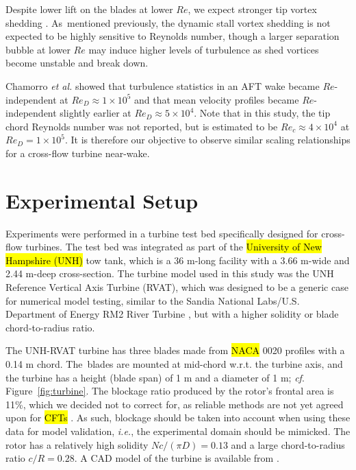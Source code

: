 \documentclass[energies,article,accept,moreauthors,pdftex,10pt,a4paper]{mdpi}
\theoremstyle{mdpi}
\newcounter{ex}
\newcounter{re}
\begin{document}
Despite lower lift on the blades at lower $Re$, we expect stronger tip vortex
shedding \cite{Yoon2005}. As~mentioned previously, the dynamic stall vortex
shedding is not expected to be highly sensitive to Reynolds number, though a
larger separation bubble at lower $Re$ may induce higher levels of turbulence as
shed vortices become unstable and break down. 

Chamorro \emph{et al.} \cite{Chamorro2012} showed that turbulence statistics in an AFT%
wake became $Re$-independent at $Re_D \approx 1 \times 10^5$ and that mean
velocity profiles became $Re$-independent slightly earlier at $Re_D \approx 5
\times 10^4$. Note that in this study, the tip chord Reynolds number was not
reported, but is estimated to be $Re_c \approx 4 \times 10^4$ at $Re_D=1 \times
10^5$. It is therefore our objective to observe similar scaling relationships
for a cross-flow turbine near-wake.


\section{Experimental Setup}

Experiments were performed in a turbine test bed specifically designed for
cross-flow turbines. The test bed was integrated as part of the \hl {University of New Hampshire (UNH)} 
 tow tank,
which is a 36 m-long facility with a 3.66 m-wide and 2.44 m-deep cross-section.
The turbine model used in this study was the UNH Reference Vertical Axis Turbine
(RVAT), which was designed to be a generic case for numerical model testing,
similar to the Sandia National Labs/U.S. Department of Energy RM2%
 River Turbine
\cite{Neary2014}, but with a higher solidity or blade chord-to-radius ratio.

The UNH-RVAT turbine has three blades made from \hl {NACA} 0020 profiles
  with a 0.14 m
chord. The~blades are mounted at mid-chord w.r.t. the turbine axis, and the
turbine has a height (blade span) of 1 m and a diameter of 1 m; \textit{cf}.
Figure~\ref{fig:turbine}. The blockage ratio produced by the rotor's frontal
area is 11\%, which we decided not to correct for, as reliable methods are
not yet agreed upon for \hl {CFTs} %
\cite{Cavagnaro2014}. As such, blockage should be
taken into account when using these data for model validation, \emph{i.e.}, the
experimental domain should be mimicked. The rotor has a relatively high solidity
$Nc/(\pi D) = 0.13$ and a large chord-to-radius ratio $c/R = 0.28$. A CAD model of
the turbine is available from \cite{Bachant2014-RVAT-CAD}.
\end{document}

